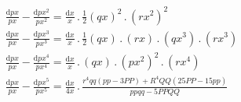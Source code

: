 \[
\begin{gathered}
\frac{\mathrm{d}px}{px}-\frac{\mathrm{d}px^2}{px^2}
=\frac{\mathrm{d}x}{x}\,.\,\tfrac12(qx)^2\,.\,(rx^2)^2\\[8pt]
\frac{\mathrm{d}px}{px}-\frac{\mathrm{d}px^3}{px^3}
=\frac{\mathrm{d}x}{x}\,.\,\tfrac12(qx)\,.\,(rx)\,.\,(qx^3)\,.\,(rx^3)\\[8pt]
\frac{\mathrm{d}px}{px}-\frac{\mathrm{d}px^4}{px^4}
=\frac{\mathrm{d}x}{x}\,.\,(qx)\,.\,(px^2)^2\,.\,(rx^4)\\[8pt]
\frac{\mathrm{d}px}{px}-\frac{\mathrm{d}px^5}{px^5}
=\frac{\mathrm{d}x}{4x}\,.\,
\frac{r^4qq(pp-3PP)+R^4QQ(25PP-15pp)}{ppqq-5PPQQ}
\end{gathered}
\]
\clearpage
\endgroup
